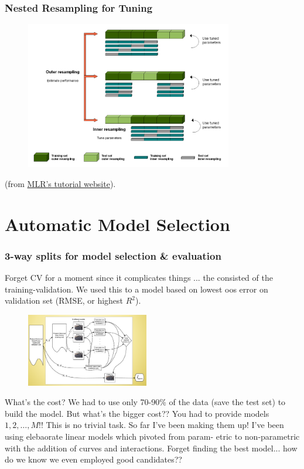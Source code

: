 \documentclass[handout]{beamer}
\begin{document}
\begin{frame}\frametitle{Nested Resampling for Tuning}

\begin{figure}
\centering
\includegraphics[width=3.56in]{nested_resampling_for_tuning.png}
\end{figure}

(from \href{https://mlr-org.github.io/mlr-tutorial/devel/html/nested_resampling/index.html}{MLR's tutorial website}).
\end{frame}

\section{Automatic Model Selection}

\begin{frame}\frametitle{3-way splits for model selection \& evaluation}
\small
Forget CV for a moment since it complicates things ... the  consisted of the training-validation. We used this to  a model based on lowest oos error on validation set (RMSE, or highest $R^2$). 

\vspace{-0.2cm}
\begin{figure}
\centering
\includegraphics[width=2.1in]{training_validation}
\end{figure}
\vspace{-0.2cm}
What's the cost? \pause We had to use only 70-90\% of the data (save the test set) to build the model. But what's the bigger cost?? \pause You had to provide models $1, 2, \ldots, M$!! This is no trivial task. So far I've been making them up! I've been using elebaorate linear models which pivoted from param- etric to non-parametric with the addition of curves and interactions. Forget finding the best model... how do we know we even employed good candidates?? \pause {}

\end{frame}
\end{document}
